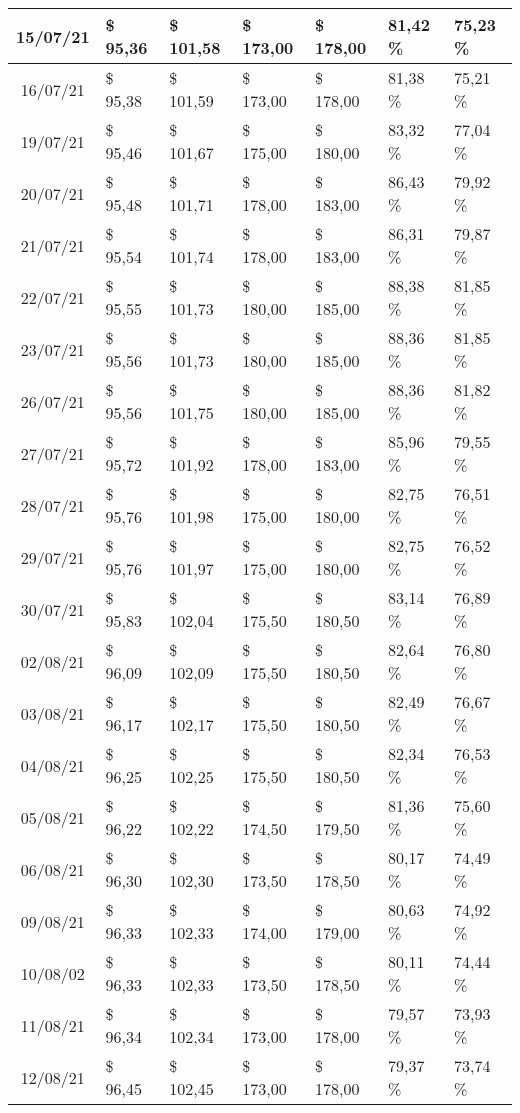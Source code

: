 \begin{center}
\begin{longtable}{|c|p{1.5cm}|p{1.5cm}|p{1.5cm}|p{1.5cm}|p{1.5cm}|p{1.5cm}|}
15/07/21 & \$ 95,36 & \$ 101,58 & \$ 173,00 & \$ 178,00 & 81,42 \% & 75,23 \% \\ \hline
16/07/21 & \$ 95,38 & \$ 101,59 & \$ 173,00 & \$ 178,00 & 81,38 \% & 75,21 \% \\ \hline
19/07/21 & \$ 95,46 & \$ 101,67 & \$ 175,00 & \$ 180,00 & 83,32 \% & 77,04 \% \\ \hline
20/07/21 & \$ 95,48 & \$ 101,71 & \$ 178,00 & \$ 183,00 & 86,43 \% & 79,92 \% \\ \hline
21/07/21 & \$ 95,54 & \$ 101,74 & \$ 178,00 & \$ 183,00 & 86,31 \% & 79,87 \% \\ \hline
22/07/21 & \$ 95,55 & \$ 101,73 & \$ 180,00 & \$ 185,00 & 88,38 \% & 81,85 \% \\ \hline
23/07/21 & \$ 95,56 & \$ 101,73 & \$ 180,00 & \$ 185,00 & 88,36 \% & 81,85 \% \\ \hline
26/07/21 & \$ 95,56 & \$ 101,75 & \$ 180,00 & \$ 185,00 & 88,36 \% & 81,82 \% \\ \hline
27/07/21 & \$ 95,72 & \$ 101,92 & \$ 178,00 & \$ 183,00 & 85,96 \% & 79,55 \% \\ \hline
28/07/21 & \$ 95,76 & \$ 101,98 & \$ 175,00 & \$ 180,00 & 82,75 \% & 76,51 \% \\ \hline
29/07/21 & \$ 95,76 & \$ 101,97 & \$ 175,00 & \$ 180,00 & 82,75 \% & 76,52 \% \\ \hline
30/07/21 & \$ 95,83 & \$ 102,04 & \$ 175,50 & \$ 180,50 & 83,14 \% & 76,89 \% \\ \hline
02/08/21 & \$ 96,09 & \$ 102,09 & \$ 175,50 & \$ 180,50 & 82,64 \% & 76,80 \% \\ \hline
03/08/21 & \$ 96,17 & \$ 102,17 & \$ 175,50 & \$ 180,50 & 82,49 \% & 76,67 \% \\ \hline
04/08/21 & \$ 96,25 & \$ 102,25 & \$ 175,50 & \$ 180,50 & 82,34 \% & 76,53 \% \\ \hline
05/08/21 & \$ 96,22 & \$ 102,22 & \$ 174,50 & \$ 179,50 & 81,36 \% & 75,60 \% \\ \hline
06/08/21 & \$ 96,30 & \$ 102,30 & \$ 173,50 & \$ 178,50 & 80,17 \% & 74,49 \% \\ \hline
09/08/21 & \$ 96,33 & \$ 102,33 & \$ 174,00 & \$ 179,00 & 80,63 \% & 74,92 \% \\ \hline
10/08/02 & \$ 96,33 & \$ 102,33 & \$ 173,50 & \$ 178,50 & 80,11 \% & 74,44 \% \\ \hline
11/08/21 & \$ 96,34 & \$ 102,34 & \$ 173,00 & \$ 178,00 & 79,57 \% & 73,93 \% \\ \hline
12/08/21 & \$ 96,45 & \$ 102,45 & \$ 173,00 & \$ 178,00 & 79,37 \% & 73,74 \% \\ \hline

\end{longtable}
\end{center}
